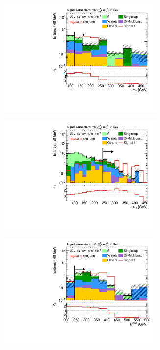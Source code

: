 \begin{figure}
	\centering
	\begin{subfigure}[b]{0.5\linewidth}
		\centering\includegraphics[width=0.9\textwidth]{N-1_cut_scan/n1_400_200/mt}
	\end{subfigure}\hfill
	\begin{subfigure}[b]{0.5\linewidth}
		\centering\includegraphics[width=0.9\textwidth]{N-1_cut_scan/n1_400_200/mct}
	\end{subfigure}\hfill
	\begin{subfigure}[b]{0.5\linewidth}
		\centering\includegraphics[width=0.9\textwidth]{N-1_cut_scan/n1_400_200/met}

\end{subfigure}
\end{figure}

